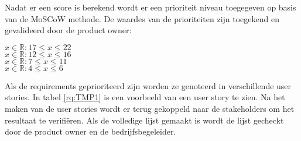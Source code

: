 \whitespace
Nadat er een score is berekend wordt er een prioriteit niveau toegegeven op basis van de MoSCoW methode.
De waardes van de prioriteiten zijn toegekend en gevalideerd door de product owner:

\whitespace
{} $ x \in \mathbb{R} : 17 \leq x \leq 22 $ \\
 $ x \in \mathbb{R} : 12 \leq x \leq 16 $ \\
 $ x \in \mathbb{R} : 7 \leq x \leq 11 $ \\
 $ x \in \mathbb{R} : 4 \leq x \leq 6 $


\whitespace
Als de requirements geprioriteerd zijn worden ze genoteerd in verschillende user stories.
In tabel \ref{rq:TMP1} is een voorbeeld van een user story te zien.
Na het maken van de user stories wordt er terug gekoppeld naar de stakeholders om het resultaat te verifiëren.
Als de volledige lijst gemaakt is wordt de lijst gecheckt door de product owner en de bedrijfsbegeleider.


